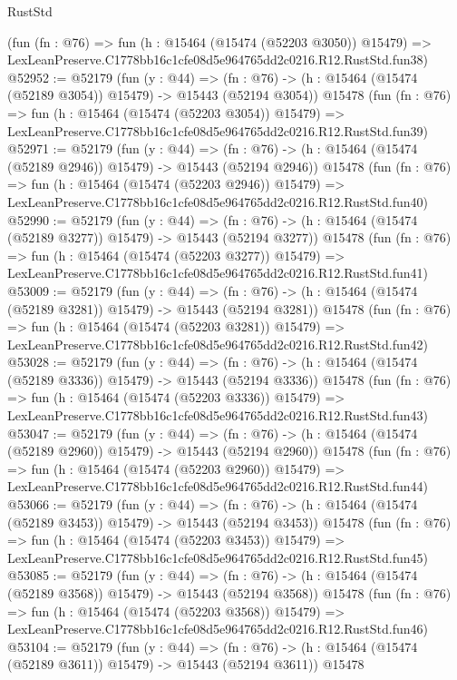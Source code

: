 \begin{lexlean}{RustStd}
\begin{coremodule}
    (fun (fn : @76) =>
    fun (h : @15464 (@15474 (@52203 @3050)) @15479) =>
    LexLeanPreserve.C1778bb16c1cfe08d5e964765dd2c0216.R12.RustStd.fun38)
@52952 := @52179
    (fun (y : @44) =>
    (fn : @76) -> (h : @15464 (@15474 (@52189 @3054)) @15479) -> @15443 (@52194 @3054))
    @15478
    (fun (fn : @76) =>
    fun (h : @15464 (@15474 (@52203 @3054)) @15479) =>
    LexLeanPreserve.C1778bb16c1cfe08d5e964765dd2c0216.R12.RustStd.fun39)
@52971 := @52179
    (fun (y : @44) =>
    (fn : @76) -> (h : @15464 (@15474 (@52189 @2946)) @15479) -> @15443 (@52194 @2946))
    @15478
    (fun (fn : @76) =>
    fun (h : @15464 (@15474 (@52203 @2946)) @15479) =>
    LexLeanPreserve.C1778bb16c1cfe08d5e964765dd2c0216.R12.RustStd.fun40)
@52990 := @52179
    (fun (y : @44) =>
    (fn : @76) -> (h : @15464 (@15474 (@52189 @3277)) @15479) -> @15443 (@52194 @3277))
    @15478
    (fun (fn : @76) =>
    fun (h : @15464 (@15474 (@52203 @3277)) @15479) =>
    LexLeanPreserve.C1778bb16c1cfe08d5e964765dd2c0216.R12.RustStd.fun41)
@53009 := @52179
    (fun (y : @44) =>
    (fn : @76) -> (h : @15464 (@15474 (@52189 @3281)) @15479) -> @15443 (@52194 @3281))
    @15478
    (fun (fn : @76) =>
    fun (h : @15464 (@15474 (@52203 @3281)) @15479) =>
    LexLeanPreserve.C1778bb16c1cfe08d5e964765dd2c0216.R12.RustStd.fun42)
@53028 := @52179
    (fun (y : @44) =>
    (fn : @76) -> (h : @15464 (@15474 (@52189 @3336)) @15479) -> @15443 (@52194 @3336))
    @15478
    (fun (fn : @76) =>
    fun (h : @15464 (@15474 (@52203 @3336)) @15479) =>
    LexLeanPreserve.C1778bb16c1cfe08d5e964765dd2c0216.R12.RustStd.fun43)
@53047 := @52179
    (fun (y : @44) =>
    (fn : @76) -> (h : @15464 (@15474 (@52189 @2960)) @15479) -> @15443 (@52194 @2960))
    @15478
    (fun (fn : @76) =>
    fun (h : @15464 (@15474 (@52203 @2960)) @15479) =>
    LexLeanPreserve.C1778bb16c1cfe08d5e964765dd2c0216.R12.RustStd.fun44)
@53066 := @52179
    (fun (y : @44) =>
    (fn : @76) -> (h : @15464 (@15474 (@52189 @3453)) @15479) -> @15443 (@52194 @3453))
    @15478
    (fun (fn : @76) =>
    fun (h : @15464 (@15474 (@52203 @3453)) @15479) =>
    LexLeanPreserve.C1778bb16c1cfe08d5e964765dd2c0216.R12.RustStd.fun45)
@53085 := @52179
    (fun (y : @44) =>
    (fn : @76) -> (h : @15464 (@15474 (@52189 @3568)) @15479) -> @15443 (@52194 @3568))
    @15478
    (fun (fn : @76) =>
    fun (h : @15464 (@15474 (@52203 @3568)) @15479) =>
    LexLeanPreserve.C1778bb16c1cfe08d5e964765dd2c0216.R12.RustStd.fun46)
@53104 := @52179
    (fun (y : @44) =>
    (fn : @76) -> (h : @15464 (@15474 (@52189 @3611)) @15479) -> @15443 (@52194 @3611))
    @15478

\end{coremodule}
\end{lexlean}
